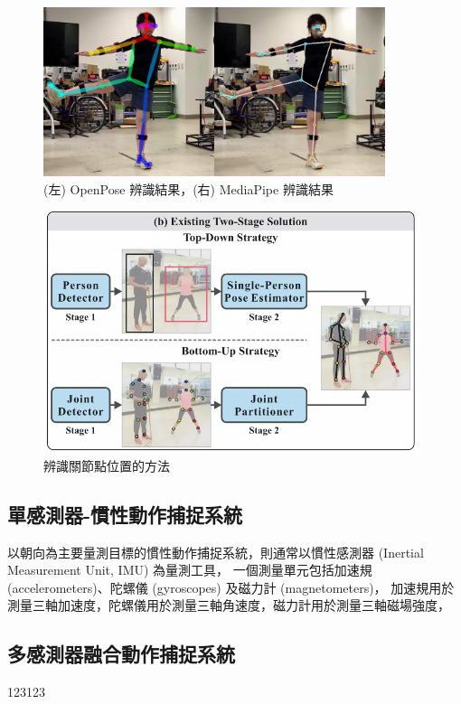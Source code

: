 \begin{figure}[!ht]
    \centering
    \includegraphics[width=10cm]{figure/ch2_fig_rec_result.png}
     \caption[(左) OpenPose 辨識結果，(右) MediaPipe 辨識結果]{(左) OpenPose 辨識結果，(右) MediaPipe 辨識結果}
     \label{ch2_fig_rec_result}
\end{figure}

\begin{figure}[!ht]
    \centering
    \includegraphics[width=11cm]{figure/ch2_fig_topvsbottom.png}
     \caption[辨識關節點位置的方法 ~\cite{nie2019single}]{辨識關節點位置的方法 ~\cite{nie2019single}}
     \label{ch2_fig_topvsbottom}
 \end{figure}

\subsection{單感測器-慣性動作捕捉系統}
以朝向為主要量測目標的慣性動作捕捉系統，則通常以慣性感測器 (Inertial Measurement Unit, IMU) 為量測工具，
一個測量單元包括加速規 (accelerometers)、陀螺儀 (gyroscopes) 及磁力計 (magnetometers)，
加速規用於測量三軸加速度，陀螺儀用於測量三軸角速度，磁力計用於測量三軸磁場強度，

\subsection{多感測器融合動作捕捉系統}
123123


